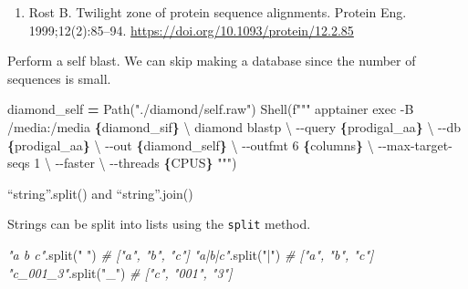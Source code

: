 \documentclass[
]{book}
\newenvironment{Shaded}{\begin{snugshade}}{\end{snugshade}}
\newcommand{\CharTok}[1]{\textcolor[rgb]{0.31,0.60,0.02}{#1}}
\newcommand{\CommentTok}[1]{\textcolor[rgb]{0.56,0.35,0.01}{\textit{#1}}}
\newcommand{\NormalTok}[1]{#1}
\newcommand{\OperatorTok}[1]{\textcolor[rgb]{0.81,0.36,0.00}{\textbf{#1}}}
\newcommand{\SpecialCharTok}[1]{\textcolor[rgb]{0.81,0.36,0.00}{\textbf{#1}}}
\newcommand{\SpecialStringTok}[1]{\textcolor[rgb]{0.31,0.60,0.02}{#1}}
\newcommand{\StringTok}[1]{\textcolor[rgb]{0.31,0.60,0.02}{#1}}
\providecommand{\tightlist}{%
  \setlength{\itemsep}{0pt}\setlength{\parskip}{0pt}}
\begin{document}
\begin{enumerate}
\def\labelenumi{\arabic{enumi}.}
\tightlist
\item
  Rost B. Twilight zone of protein sequence alignments. Protein Eng. 1999;12(2):85--94. \url{https://doi.org/10.1093/protein/12.2.85}
\end{enumerate}

Perform a self blast. We can skip making a database since the number of sequences is small.

\begin{Shaded}
\begin{Highlighting}[numbers=left,,]
\NormalTok{diamond\_self }\OperatorTok{=}\NormalTok{ Path(}\StringTok{"./diamond/self.raw"}\NormalTok{)}
\NormalTok{Shell(}\SpecialStringTok{f"""}
\SpecialStringTok{apptainer exec {-}B /media:/media }\SpecialCharTok{\{}\NormalTok{diamond\_sif}\SpecialCharTok{\}}\SpecialStringTok{ }\CharTok{\textbackslash{}}
\SpecialStringTok{    diamond blastp }\CharTok{\textbackslash{}}
\SpecialStringTok{        {-}{-}query }\SpecialCharTok{\{}\NormalTok{prodigal\_aa}\SpecialCharTok{\}}\SpecialStringTok{ }\CharTok{\textbackslash{}}
\SpecialStringTok{        {-}{-}db }\SpecialCharTok{\{}\NormalTok{prodigal\_aa}\SpecialCharTok{\}}\SpecialStringTok{ }\CharTok{\textbackslash{}}
\SpecialStringTok{        {-}{-}out }\SpecialCharTok{\{}\NormalTok{diamond\_self}\SpecialCharTok{\}}\SpecialStringTok{ }\CharTok{\textbackslash{}}
\SpecialStringTok{        {-}{-}outfmt 6 }\SpecialCharTok{\{}\NormalTok{columns}\SpecialCharTok{\}}\SpecialStringTok{ }\CharTok{\textbackslash{}}
\SpecialStringTok{        {-}{-}max{-}target{-}seqs 1 }\CharTok{\textbackslash{}}
\SpecialStringTok{        {-}{-}faster }\CharTok{\textbackslash{}}
\SpecialStringTok{        {-}{-}threads }\SpecialCharTok{\{}\NormalTok{CPUS}\SpecialCharTok{\}}
\SpecialStringTok{"""}\NormalTok{)}
\end{Highlighting}
\end{Shaded}

``string''.split() and ``string''.join()

Strings can be split into lists using the \texttt{split} method.

\begin{Shaded}
\begin{Highlighting}[numbers=left,,]
\CommentTok{"a b c"}\NormalTok{.split(}\StringTok{" "}\NormalTok{) }\CommentTok{\# ["a", "b", "c"]}
\CommentTok{"a|b|c"}\NormalTok{.split(}\StringTok{"|"}\NormalTok{) }\CommentTok{\# ["a", "b", "c"]}
\CommentTok{"c\_001\_3"}\NormalTok{.split(}\StringTok{"\_"}\NormalTok{) }\CommentTok{\# ["c", "001", "3"]}
\end{Highlighting}
\end{Shaded}
\end{document}
